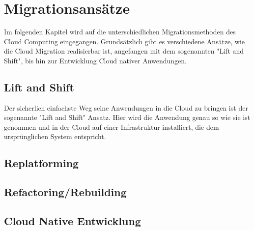 \section{Migrationsansätze}

Im folgenden Kapitel wird auf die unterschiedlichen Migrationsmethoden des Cloud Computing eingegangen.
Grundsätzlich gibt es verschiedene Ansätze, wie die Cloud Migration realisierbar ist,
angefangen mit dem sogenannten "Lift and Shift", bis hin zur Entwicklung Cloud nativer Anwendungen.

\subsection{Lift and Shift}
Der sicherlich einfachste Weg seine Anwendungen in die Cloud zu bringen ist der sogenannte "Lift and Shift" Ansatz.
Hier wird die Anwendung genau so wie sie ist genommen und in der Cloud auf einer Infrastruktur installiert, die
dem ursprünglichen System entspricht.

\subsection{Replatforming}

\subsection{Refactoring/Rebuilding}

\subsection{Cloud Native Entwicklung}
